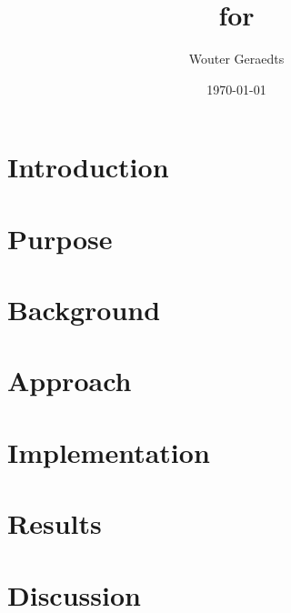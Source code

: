 \documentclass[a4paper,oneside]{article}
\title{\Premiseselection for \coq}
\author{Wouter Geraedts}
\date{\today}
\begin{document}
	

	{
		\thispagestyle{empty}
		\tableofcontents
		\clearpage
	}

	\section{Introduction}
	

	\section{Purpose}
	

	\section{Background}
	

	\section{Approach}
	

	\section{Implementation}
	

	\section{Results}
	

	\section{Discussion}
	

    
    

	\printglossaries
\end{document}
